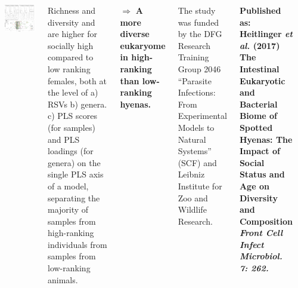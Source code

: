 \documentclass[30pt, a0paper, portrait, margin=0mm, innermargin=15mm,
               blockverticalspace=15mm, colspace=15mm, subcolspace=8mm]{tikzposter}
\begin{document}
\begin{columns}
 {
  \begin{minipage}{0.7\linewidth}                  
    \includegraphics[scale=0.67]{Figure4_man.png}
  \end{minipage}
  \hfill
  \begin{minipage}{0.3\linewidth}
     Richness and diversity and are higher for socially
    high compared to low ranking females, both at the level of a) RSVs
    b) genera.  c) PLS scores (for samples) and PLS loadings (for
    genera) on the single PLS axis of a model, separating the majority
    of samples from high-ranking individuals from samples from
    low-ranking animals.
  \end{minipage}
  $\Rightarrow$ \textbf{A more diverse eukaryome in high-ranking than
    low-ranking hyenas.} }


{

  The study was funded by the DFG Research Training Group 2046
  ``Parasite Infections: From Experimental Models to Natural Systems''
  (SCF) and Leibniz Institute for Zoo and Wildlife Research.

  \textbf{Published as:
  \hangindent=2cm  Heitlinger \textit{et al.} (2017) The
    Intestinal Eukaryotic and Bacterial Biome of Spotted Hyenas:
    The Impact of Social Status and Age on Diversity and
    Composition \textit{Front Cell Infect Microbiol. 7: 262.}}
}

      {
        \begin{small}


\end{small}}
\end{columns}
\end{document}
